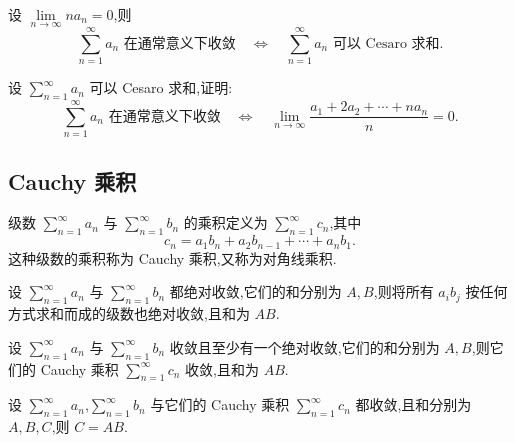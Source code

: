 \documentclass[../数学分析培优讲义.tex]{subfiles}
\begin{document}
\begin{example}[\markstar]
设 $\displaystyle\lim\limits_{n\to\infty}na_n=0$,则
\[
    \sum\limits_{n=1}^{\infty}a_n\text{ 在通常意义下收敛}
    \quad\Longleftrightarrow\quad
    \sum\limits_{n=1}^{\infty}a_n\text{ 可以 Cesaro 求和}.
\]
\end{example}
\exampleblank

\begin{example}[\markstar]
设 $\displaystyle\sum\limits_{n=1}^{\infty}a_n$ 可以 Cesaro 求和,证明:
\[
    \sum\limits_{n=1}^{\infty}a_n\text{ 在通常意义下收敛}
    \quad\Longleftrightarrow\quad
    \lim\limits_{n\to\infty}\dfrac{a_1+2a_2+\cdots+na_n}{n}=0.
\]
\end{example}
\exampleblank


\newpage

\subsection{Cauchy 乘积}

\begin{definition}
级数 $\displaystyle\sum\limits_{n=1}^{\infty}a_n$ 与 $\displaystyle\sum\limits_{n=1}^{\infty}b_n$ 的乘积定义为 $\displaystyle\sum\limits_{n=1}^{\infty}c_n$,其中
\[
    c_n=a_1b_n+a_2b_{n-1}+\cdots+a_nb_1.
\]
这种级数的乘积称为 Cauchy 乘积,又称为对角线乘积.
\end{definition}

\begin{theorem}
设 $\displaystyle\sum\limits_{n=1}^{\infty}a_n$ 与 $\displaystyle\sum\limits_{n=1}^{\infty}b_n$ 都绝对收敛,它们的和分别为 $A,B$,则将所有 $a_ib_j$ 按任何方式求和而成的级数也绝对收敛,且和为 $AB$.
\end{theorem}

\begin{theorem}
设 $\displaystyle\sum\limits_{n=1}^{\infty}a_n$ 与 $\displaystyle\sum\limits_{n=1}^{\infty}b_n$ 收敛且至少有一个绝对收敛,它们的和分别为 $A,B$,则它们的 Cauchy 乘积 $\displaystyle\sum\limits_{n=1}^{\infty}c_n$ 收敛,且和为 $AB$.
\end{theorem}

\begin{theorem}
设 $\displaystyle\sum\limits_{n=1}^{\infty}a_n$,$\displaystyle\sum\limits_{n=1}^{\infty}b_n$ 与它们的 Cauchy 乘积 $\displaystyle\sum\limits_{n=1}^{\infty}c_n$ 都收敛,且和分别为 $A,B,C$,则 $C=AB$.
\end{theorem}
\end{document}
